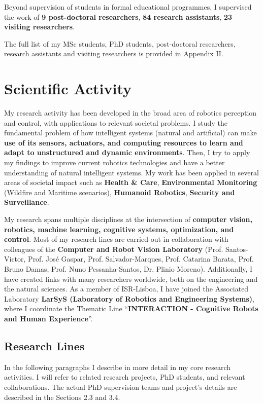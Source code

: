 \documentclass[
]{article}
\begin{document}
Beyond supervision of students in formal educational programmes, I
supervised the work of \textbf{9 post-doctoral researchers}, \textbf{84
research assistants}, \textbf{23 visiting researchers}.

The full list of my MSc students, PhD students, post-doctoral
researchers, research assistants and visiting researchers is provided in
Appendix II.

\section{Scientific Activity}\label{scientific-activity}

My research activity has been developed in the broad area of robotics
perception and control, with applications to relevant societal problems.
I study the fundamental problem of how intelligent systems (natural and
artificial) can make \textbf{use of its sensors, actuators, and
computing resources to learn and adapt to unstructured and dynamic
environments}. Then, I try to apply my findings to improve current
robotics technologies and have a better understanding of natural
intelligent systems. My work has been applied in several areas of
societal impact such as \textbf{Health \& Care}, \textbf{Environmental
Monitoring} (Wildfire and Maritime scenarios), \textbf{Humanoid
Robotics}, \textbf{Security and Surveillance}.

My research spans multiple disciplines at the intersection of
\textbf{computer vision, robotics, machine learning, cognitive systems,
optimization, and control}. Most of my research lines are carried-out in
collaboration with colleagues of the \textbf{Computer and Robot Vision
Laboratory} (Prof. Santos-Victor, Prof. José Gaspar, Prof.
Salvador-Marques, Prof. Catarina Barata, Prof. Bruno Damas, Prof. Nuno
Pessanha-Santos, Dr. Plinio Moreno). Additionally, I have created links
with many researchers worldwide, both on the engineering and the natural
sciences. As a member of ISR-Lisboa, I have joined the Associated
Laboratory \textbf{LarSyS (Laboratory of Robotics and Engineering
Systems)}, where I coordinate the Thematic Line ``\textbf{INTERACTION -
Cognitive Robots and Human Experience}''.

\subsection{Research Lines}\label{research-lines}

In the following paragraphs I describe in more detail in my core
research activities. I will refer to related research projects, PhD
students, and relevant collaborations. The actual PhD supervision teams
and project's details are described in the Sections \hl{}2.3 and
\hl{}3.4.
\end{document}
